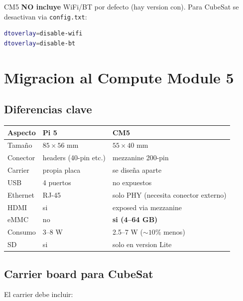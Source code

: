 \documentclass[11pt,a4paper,oneside]{report}
\begin{document}
CM5 \textbf{NO incluye} WiFi/BT por defecto (hay version con). Para
CubeSat se desactivan via \texttt{config.txt}:

\begin{lstlisting}[language=bash]
dtoverlay=disable-wifi
dtoverlay=disable-bt
\end{lstlisting}

\chapter{Migracion al Compute Module 5}

\section{Diferencias clave}

\begin{center}
\begin{tabular}{lll}
\toprule
\textbf{Aspecto} & \textbf{Pi 5} & \textbf{CM5} \\
\midrule
Tamaño              & $85 \times 56$ mm     & $55 \times 40$ mm \\
Conector            & headers (40-pin etc.) & mezzanine 200-pin \\
Carrier             & propia placa          & se diseña aparte \\
USB                 & 4 puertos             & no expuestos \\
Ethernet            & RJ-45                 & solo PHY (necesita conector externo) \\
HDMI                & si                    & exposed via mezzanine \\
eMMC                & no                    & \textbf{si (4--64 GB)} \\
Consumo             & 3--8 W                & 2.5--7 W ($\sim 10\%$ menos) \\
SD                  & si                    & solo en version Lite \\
\bottomrule
\end{tabular}
\end{center}

\section{Carrier board para CubeSat}

El carrier debe incluir:
\end{document}
